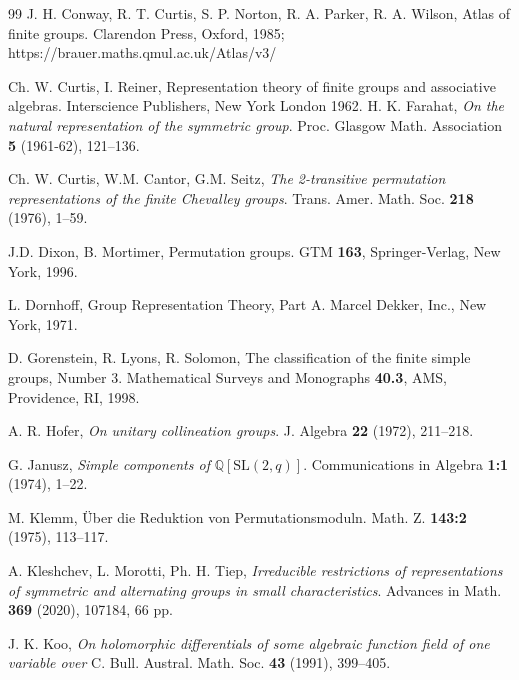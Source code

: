 \documentclass[12pt,a4paper,reqno]{amsart}
\def\Q{{\mathbb Q}}
\def\SL{\mathrm{SL}}
\theoremstyle{definition}
\begin{document}
\begin{thebibliography}{99}
 J. H. Conway, R. T. Curtis, S. P. Norton, R. A. Parker, R. A. Wilson, Atlas of finite groups. Clarendon Press, Oxford, 1985;
https://brauer.maths.qmul.ac.uk/Atlas/v3/

 Ch. W. Curtis, I. Reiner, Representation theory of finite groups
and associative algebras. Interscience Publishers, New York London 1962.
 H. K. Farahat, {\sl On the natural representation of the symmetric group}. Proc. Glasgow Math. Association {\bf 5} (1961-62), 121--136.

 Ch. W. Curtis, W.M. Cantor, G.M. Seitz, {\em The 2-transitive permutation representations of the finite Chevalley groups}. Trans. Amer. Math. Soc. {\bf 218} (1976), 1--59.

 J.D. Dixon, B. Mortimer, Permutation groups. GTM {\bf 163}, Springer-Verlag, New York, 1996.

  L. Dornhoff, Group Representation Theory, Part A. Marcel Dekker, Inc., New York, 1971.

 D. Gorenstein, R. Lyons, R. Solomon, The classification  of the finite simple groups, Number 3. Mathematical Surveys and Monographs {\bf 40.3}, AMS, Providence, RI, 1998.

 A. R. Hofer, {\em On unitary collineation groups}. 
J. Algebra {\bf 22 }(1972), 211--218.




  G. Janusz, {\em Simple components of} $\Q[\SL(2,q)]$.  Communications in Algebra {\bf 1:1} (1974), 1--22.

 M. Klemm, 
\"Uber die Reduktion von Permutationsmoduln. 
Math. Z. {\bf 143:2} (1975),  113–117.

 A. Kleshchev, L. Morotti, Ph. H. Tiep, {\em Irreducible restrictions of representations of symmetric and alternating groups in small characteristics}. Advances in Math. {\bf 369} (2020), 
107184, 66 pp.

 J. K. Koo, {\em On holomorphic differentials of some algebraic function field of one variable over} C. Bull. Austral. Math. Soc. {\bf 43} (1991), 399--405.



\end{thebibliography}
\end{document}
